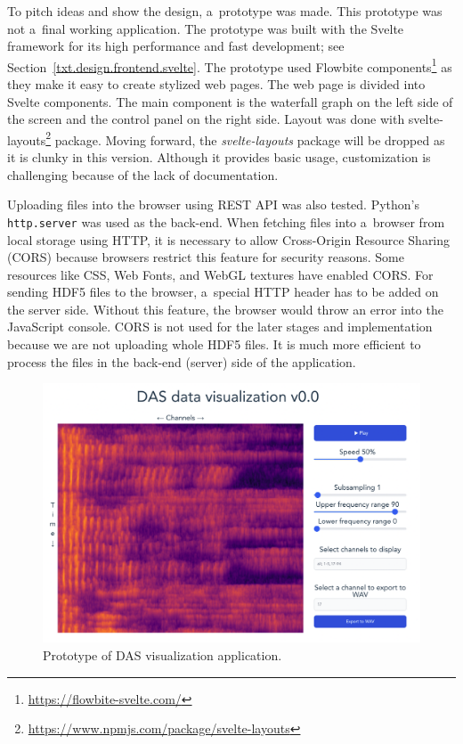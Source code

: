To pitch ideas and show the design, a~prototype was made. This prototype was not a~final working application. The prototype was built with the Svelte framework for its high performance and fast development; see Section~\ref{txt.design.frontend.svelte}. The prototype used Flowbite components\footnote{\url{https://flowbite-svelte.com/}} as they make it easy to create stylized web pages. The web page is divided into Svelte components. The main component is the waterfall graph on the left side of the screen and the control panel on the right side. Layout was done with svelte-layouts\footnote{\url{https://www.npmjs.com/package/svelte-layouts}} package. Moving forward, the \textit{svelte-layouts} package will be dropped as it is clunky in this version. Although it provides basic usage, customization is challenging because of the lack of documentation.

Uploading files into the browser using REST API was also tested. Python's \verb|http.server| was used as the back-end. When fetching files into a~browser from local storage using HTTP, it is necessary to allow Cross-Origin Resource Sharing (CORS) because browsers restrict this feature for security reasons. Some resources like CSS, Web Fonts, and WebGL textures have enabled CORS. For sending HDF5 files to the browser, a~special HTTP header has to be added on the server side. Without this feature, the browser would throw an error into the JavaScript console. CORS is not used for the later stages and implementation because we are not uploading whole HDF5 files. It is much more efficient to process the files in the back-end (server) side of the application.

\begin{figure}[h]
    \centering
    \includegraphics[width=\linewidth]{obrazky/svelte_prototype.png}
    \caption{Prototype of DAS visualization application.}
    \label{fig:prototypesvelte}
\end{figure}
